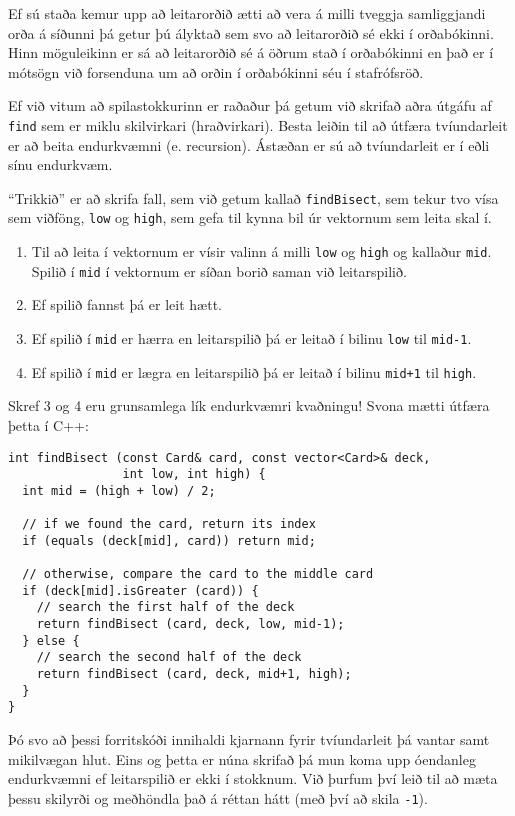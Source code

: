 Ef sú staða kemur upp að leitarorðið ætti að vera á milli tveggja samliggjandi orða á síðunni
þá getur þú ályktað sem svo að leitarorðið sé ekki í orðabókinni.
Hinn möguleikinn er sá að leitarorðið sé á öðrum stað í orðabókinni
en það er í mótsögn við forsenduna um að orðin í orðabókinni séu í stafrófsröð.

Ef við vitum að spilastokkurinn er raðaður þá getum við skrifað aðra útgáfu af {\tt find}
sem er miklu skilvirkari (hraðvirkari).
Besta leiðin til að útfæra tvíundarleit er að beita endurkvæmni (e. recursion).
Ástæðan er sú að tvíundarleit er í eðli sínu endurkvæm.


``Trikkið'' er að skrifa fall, sem við getum kallað {\tt findBisect}, sem tekur tvo vísa sem viðföng,
{\tt low} og {\tt high}, sem gefa til kynna bil úr vektornum sem leita skal í. 

\begin{enumerate}

\item Til að leita í vektornum er vísir valinn á milli {\tt low} og {\tt high} og kallaður {\tt mid}.
Spilið í {\tt mid} í vektornum er síðan borið saman við leitarspilið. 

\item Ef spilið fannst þá er leit hætt. 

\item Ef spilið í {\tt mid} er hærra en leitarspilið þá er leitað í bilinu {\tt low} til {\tt mid-1}.

\item Ef spilið í {\tt mid} er lægra en leitarspilið þá er leitað í bilinu {\tt mid+1} til {\tt high}.

\end{enumerate}
%
Skref 3 og 4 eru grunsamlega lík endurkvæmri kvaðningu!
Svona mætti útfæra þetta í C++:

\begin{verbatim}
int findBisect (const Card& card, const vector<Card>& deck,
                int low, int high) {
  int mid = (high + low) / 2;

  // if we found the card, return its index
  if (equals (deck[mid], card)) return mid;

  // otherwise, compare the card to the middle card
  if (deck[mid].isGreater (card)) {
    // search the first half of the deck
    return findBisect (card, deck, low, mid-1);
  } else {
    // search the second half of the deck
    return findBisect (card, deck, mid+1, high);
  }
}
\end{verbatim}
%
Þó svo að þessi forritskóði innihaldi kjarnann fyrir tvíundarleit þá vantar samt mikilvægan hlut.
Eins og þetta er núna skrifað þá mun koma upp óendanleg endurkvæmni ef leitarspilið er ekki í stokknum.
Við þurfum því leið til að mæta þessu skilyrði og meðhöndla það á réttan hátt (með því að skila {\tt -1}).


